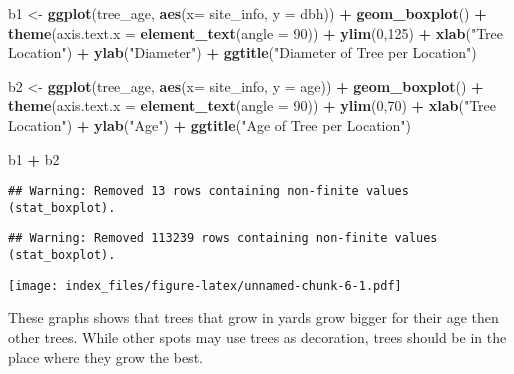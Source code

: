 \documentclass[
]{article}
\newenvironment{Shaded}{\begin{snugshade}}{\end{snugshade}}
\newcommand{\DataTypeTok}[1]{\textcolor[rgb]{0.13,0.29,0.53}{#1}}
\newcommand{\DecValTok}[1]{\textcolor[rgb]{0.00,0.00,0.81}{#1}}
\newcommand{\KeywordTok}[1]{\textcolor[rgb]{0.13,0.29,0.53}{\textbf{#1}}}
\newcommand{\NormalTok}[1]{#1}
\newcommand{\OperatorTok}[1]{\textcolor[rgb]{0.81,0.36,0.00}{\textbf{#1}}}
\newcommand{\StringTok}[1]{\textcolor[rgb]{0.31,0.60,0.02}{#1}}
\begin{document}
\begin{Shaded}
\begin{Highlighting}[]
\NormalTok{b1 <-}\StringTok{ }\KeywordTok{ggplot}\NormalTok{(tree_age, }\KeywordTok{aes}\NormalTok{(}\DataTypeTok{x=}\NormalTok{ site_info, }\DataTypeTok{y =}\NormalTok{ dbh)) }\OperatorTok{+}
\StringTok{  }\KeywordTok{geom_boxplot}\NormalTok{() }\OperatorTok{+}
\StringTok{  }\KeywordTok{theme}\NormalTok{(}\DataTypeTok{axis.text.x =} \KeywordTok{element_text}\NormalTok{(}\DataTypeTok{angle =} \DecValTok{90}\NormalTok{)) }\OperatorTok{+}
\StringTok{  }\KeywordTok{ylim}\NormalTok{(}\DecValTok{0}\NormalTok{,}\DecValTok{125}\NormalTok{) }\OperatorTok{+}
\StringTok{  }\KeywordTok{xlab}\NormalTok{(}\StringTok{"Tree Location"}\NormalTok{) }\OperatorTok{+}
\StringTok{  }\KeywordTok{ylab}\NormalTok{(}\StringTok{"Diameter"}\NormalTok{) }\OperatorTok{+}
\StringTok{  }\KeywordTok{ggtitle}\NormalTok{(}\StringTok{"Diameter of Tree per Location"}\NormalTok{)}

\NormalTok{b2 <-}\StringTok{ }\KeywordTok{ggplot}\NormalTok{(tree_age, }\KeywordTok{aes}\NormalTok{(}\DataTypeTok{x=}\NormalTok{ site_info, }\DataTypeTok{y =}\NormalTok{ age)) }\OperatorTok{+}
\StringTok{  }\KeywordTok{geom_boxplot}\NormalTok{() }\OperatorTok{+}
\StringTok{  }\KeywordTok{theme}\NormalTok{(}\DataTypeTok{axis.text.x =} \KeywordTok{element_text}\NormalTok{(}\DataTypeTok{angle =} \DecValTok{90}\NormalTok{)) }\OperatorTok{+}
\StringTok{  }\KeywordTok{ylim}\NormalTok{(}\DecValTok{0}\NormalTok{,}\DecValTok{70}\NormalTok{) }\OperatorTok{+}
\StringTok{  }\KeywordTok{xlab}\NormalTok{(}\StringTok{"Tree Location"}\NormalTok{) }\OperatorTok{+}
\StringTok{  }\KeywordTok{ylab}\NormalTok{(}\StringTok{"Age"}\NormalTok{) }\OperatorTok{+}
\StringTok{  }\KeywordTok{ggtitle}\NormalTok{(}\StringTok{"Age of Tree per Location"}\NormalTok{)}

\NormalTok{b1 }\OperatorTok{+}\StringTok{ }\NormalTok{b2}
\end{Highlighting}
\end{Shaded}

\begin{verbatim}
## Warning: Removed 13 rows containing non-finite values (stat_boxplot).
\end{verbatim}

\begin{verbatim}
## Warning: Removed 113239 rows containing non-finite values (stat_boxplot).
\end{verbatim}

\texttt{[image: index\_files/figure-latex/unnamed-chunk-6-1.pdf]}

These graphs shows that trees that grow in yards grow bigger for their
age then other trees. While other spots may use trees as decoration,
trees should be in the place where they grow the best.
\end{document}
